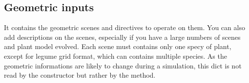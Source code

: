 \documentclass[letterpaper,10pt,english]{sphinxmanual}
\begin{document}
\subsection{Geometric inputs}
\label{\detokenize{inputs:geometric-inputs}}\label{\detokenize{inputs:geometric}}
\begin{sphinxVerbatim}[commandchars=\\\{\}]
  
                         \PYG{p}{[}   \PYG{p}{]} 
                            
                         \PYG{p}{[}  \PYG{p}{]}
                         
                                                                       
                                                                       
                                                                       
                                                                      
\end{sphinxVerbatim}

\sphinxAtStartPar
It contains the geometric scenes and directives to operate on them.
You can also add descriptions on the scenes, especially if you have a large numbers of scenes and plant model evolved.
Each scene must contains only one specy of plant, except for l\sphinxhyphen{}egume grid format, which can contains multiple species.
As the geometric informations are likely to change during a simulation, this dict is not read by the constructor but rather by the  method.
\end{document}
